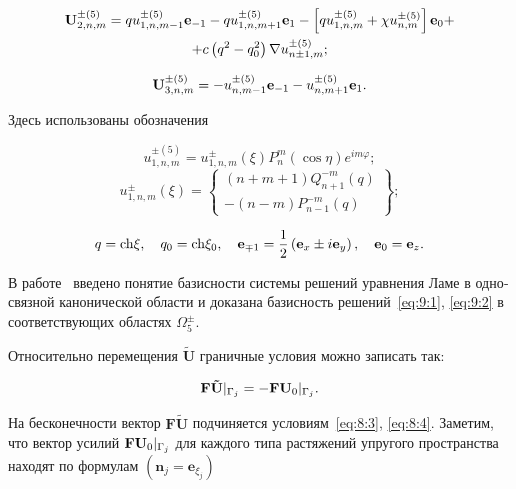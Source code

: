 \begin{russian}
\begin{multline}
{\bf{U}}_{2,n,m}^{ \pm (5)} = qu_{1,n,m - 1}^{ \pm (5)}{{\bf{e}}_{ - 1}} - qu_{1,n,m + 1}^{ \pm (5)}{{\bf{e}}_1} - \left[ {qu_{1,n,m}^{ \pm (5)} + \chi u_{n,m}^{ \pm (5)}} \right]{{\bf{e}}_0} + \\
+c\left( {{q^2} - q_0^2} \right)\nabla u_{n \pm 1,m}^{ \pm (5)};
\end{multline}

\begin{equation}
{\bf{U}}_{3,n,m}^{ \pm (5)} =  - u_{n,m - 1}^{ \pm (5)}{{\bf{e}}_{ - 1}} - u_{n,m + 1}^{ \pm (5)}{{\bf{e}}_1}.
\end{equation}

Здесь использованы обозначения
	
\begin{equation}
u_{1,n,m}^{ \pm (5)} = u_{1,n,m}^ \pm (\xi )P_n^m(\cos \eta ){e^{im\varphi }};
\end{equation}
\begin{equation}
u_{1,n,m}^ \pm (\xi ) = \left\{ \begin{array}{l}
(n + m + 1)Q_{n + 1}^{ - m}(q)\\
 - (n - m)P_{n - 1}^{ - m}(q)
\end{array} \right\};
\end{equation}

\begin{equation}
q = {\mathop{\rm ch}\nolimits} \xi ,\quad {q_0} = {\mathop{\rm ch}\nolimits} {\xi _0},\quad {{\bf{e}}_{ \mp 1}} = \frac{1}{2}\left( {{{\bf{e}}_x} \pm i{{\bf{e}}_y}} \right),\quad {{\bf{e}}_0} = {{\bf{e}}_z}.
\end{equation}

В работе~\cite{Nikolaev1998} введено понятие базисности системы решений уравнения Ламе в односвязной канонической области и доказана базисность решений~\eqref{eq:9:1}, \eqref{eq:9:2} в соответствующих областях $\Omega_5^\pm$.{\sloppy\par}

Относительно перемещения $\mathbf{\tilde U}$ граничные условия можно записать так:

\begin{equation}
{\bf{F\tilde U}}{|_{{\Gamma _j}}} =  - {\bf{F}}{{\bf{U}}_0}{|_{{\Gamma _j}}}.
\end{equation}

На бесконечности вектор $\mathbf{F\tilde U}$ подчиняется условиям~\eqref{eq:8:3}, \eqref{eq:8:4}. Заметим, что вектор усилий ${\bf{F}}{{\bf{U}}_0}{|_{{\Gamma _j}}}$ для каждого типа растяжений упругого пространства находят по формулам $(\mathbf{n}_j=\mathbf{e}_{\xi_j})$


\end{russian}
